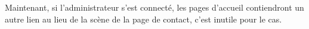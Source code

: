 \documentclass{article}
\begin{document}
\begin{enumerate}
	\vspace{0.7cm}
               \hspace*{-0.7in}
               \noindent{}  
  
  
  
  
  
  
  
  
  
  
Maintenant, si l'administrateur s'est connecté, les pages d'accueil contiendront un autre lien au lieu de la scène de la page de contact, c'est inutile pour le cas.
  
  
  
  \vspace{0.7cm}
               \hspace*{-0.7in}
               \noindent{}
  

\end{enumerate}
\end{document}
